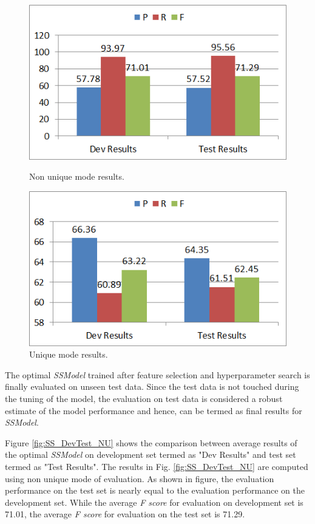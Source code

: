 \begin{figure}
\centering
\begin{minipage}{.5\textwidth}
  \centering
  \includegraphics[width=.95\textwidth]{figures/CompDevTestResultsNonUniq.png}
  \caption{Non unique mode results.}
  \label{fig:SS_DevTest_NU}
\end{minipage}%
\begin{minipage}{.5\textwidth}
  \centering
  \includegraphics[width=.95\textwidth]{figures/CompDevTestResultsUniq.png}
  \caption{Unique mode results.}
  \label{fig:SS_DevTest_U}
\end{minipage}
\end{figure}

The optimal \textit{SSModel} trained after feature selection and hyperparameter search is finally evaluated on unseen test data. Since the test data is not touched during the tuning of the model, the evaluation on test data is considered a robust estimate of the model performance and hence, can be termed as final results for \textit{SSModel}.

Figure \ref{fig:SS_DevTest_NU} shows the comparison between average results of the optimal \textit{SSModel} on development set termed as "Dev Results" and test set termed as "Test Results". The results in Fig. \ref{fig:SS_DevTest_NU} are computed using non unique mode of evaluation. As shown in figure, the evaluation performance on the test set is nearly equal to the evaluation performance on the development set. While the average \textit{F score} for evaluation on development set is 71.01, the average \textit{F score} for evaluation on the test set is 71.29.

